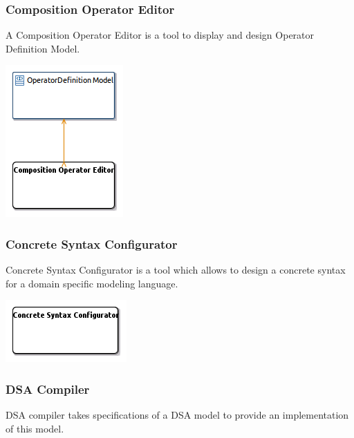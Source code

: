 \documentclass{gemoc} %
\begin{document}
\subsubsection{Composition Operator Editor}
\label{sec:Composition_Operator_Editor}
A Composition Operator Editor is a tool to display and design Operator Definition Model.
\begin{center}
\includegraphics*[trim=0.0cm 0.0cm 0cm 0.0cm, clip=true]{../images/generated/Generated_Composition_Operator_Editor.png}
\end{center}




\subsubsection{Concrete Syntax Configurator}
\label{sec:Concrete_Syntax_Configurator}
Concrete Syntax Configurator is a tool which allows to design a concrete syntax for a domain specific modeling language.
\begin{center}
\includegraphics*[trim=0.0cm 0.0cm 0cm 0.0cm, clip=true]{../images/generated/Generated_Concrete_Syntax_Configurator.png}
\end{center}




\subsubsection{DSA Compiler}
\label{sec:DSA_Compiler}
DSA compiler takes specifications of a DSA model to provide an implementation of this model.
\end{document}
